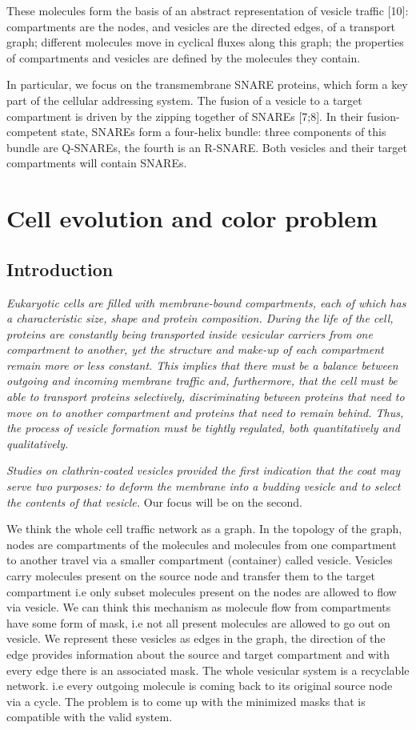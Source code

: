 \documentclass[preprint,12pt]{elsarticle}
\begin{document}
These molecules form the basis of an abstract representation of vesicle traffic [10]: compartments are the nodes, and vesicles are the directed edges, of a transport graph; different molecules move in cyclical fluxes along this graph; the properties of compartments and vesicles are defined by the molecules they contain. 

In particular, we focus on the transmembrane SNARE proteins, which form a key part of the cellular addressing system. The fusion of a vesicle to a target compartment is driven by the zipping together of SNAREs [7;8]. In their fusion-competent state, SNAREs form a four-helix bundle: three components of this bundle are Q-SNAREs, the fourth is an R-SNARE. Both vesicles and their target compartments will contain SNAREs.

\section*{Cell evolution and color problem}
\subsection{Introduction }
\textit{Eukaryotic cells are filled with membrane-bound compartments, each of which has a characteristic size, shape and protein composition. During the life of the cell, proteins are constantly being transported inside vesicular carriers from one compartment to another, yet the structure and make-up of each compartment remain more or less constant. This implies that there must be a balance between outgoing and incoming
membrane traffic and, furthermore, that the cell must be able to transport proteins selectively, discriminating between proteins that need to move on to another compartment and proteins that need to remain behind. Thus, the process of vesicle formation must be tightly regulated, both quantitatively and qualitatively.}


\textit{Studies on clathrin-coated vesicles provided the first indication that the coat may serve two purposes: to deform the membrane into a budding vesicle and to select the contents of that vesicle.} Our focus will be on the second. 

We think the whole cell traffic network as a graph. In the topology of the graph, nodes are compartments of the molecules and molecules from one compartment to another travel via a smaller compartment (container) called vesicle. Vesicles carry molecules present on the source node and transfer them to the target compartment i.e only subset molecules present on the nodes are allowed to flow via vesicle. We can think this mechanism as molecule flow from compartments have some form of mask, i.e not all present molecules are allowed to go out on vesicle. We represent these vesicles as edges in the graph, the direction of the edge provides information about the source and target compartment and with every edge there is an associated mask. The whole vesicular system is a recyclable network. i.e every outgoing molecule is coming back to its original source node via a cycle. The problem is to come up with the minimized masks that is compatible with the valid system. 
\end{document}
